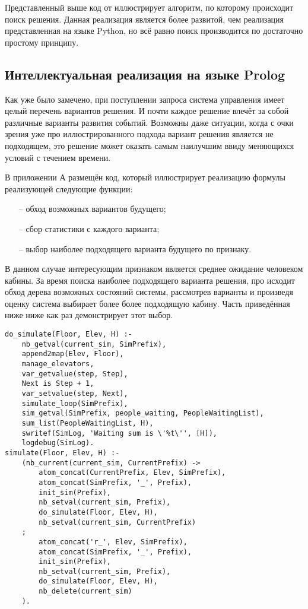 	Представленный выше код от иллюстрирует алгоритм, по которому происходит поиск решения.
		Данная реализация является более развитой, чем реализация представленная на языке Python,
		но всё равно поиск производится по достаточно простому принципу.

	\subsection{Интеллектуальная реализация на языке Prolog}

		Как уже было замечено, при поступлении запроса система управления имеет целый перечень вариантов решения.
			И почти каждое решение влечёт за собой различные варианты развития событий. Возможны даже
			ситуации, когда с очки зрения уже про иллюстрированного подхода вариант решения является не подходящем,
			это решение может оказать самым наилучшим ввиду меняющихся условий с течением времени.

		В приложении А размещён код, который иллюстрирует реализацию формулы реализующей следующие функции:
		\begin{itemize}
			\item[--] обход возможных вариантов будущего;
			\item[--] сбор статистики с каждого варианта;
			\item[--] выбор наиболее подходящего варианта будущего по признаку.
		\end{itemize}

			В данном случае интересующим признаком является среднее ожидание человеком кабины. 
				За время поиска наиболее подходящего варианта решения, про исходит обход дерева
				возможных состояний системы, рассмотрев варианты и произведя оценку система выбирает более
				более подходящую кабину. Часть приведённая ниже ниже как раз демонстрирует  этот выбор.
\begin{lstlisting}
do_simulate(Floor, Elev, H) :-
	nb_getval(current_sim, SimPrefix),
	append2map(Elev, Floor),
	manage_elevators,
	var_getvalue(step, Step),
	Next is Step + 1,
	var_setvalue(step, Next),
	simulate_loop(SimPrefix),
	sim_getval(SimPrefix, people_waiting, PeopleWaitingList),
	sum_list(PeopleWaitingList, H),
	swritef(SimLog, 'Waiting sum is \'%t\'', [H]),
	logdebug(SimLog).
simulate(Floor, Elev, H) :-
	(nb_current(current_sim, CurrentPrefix) ->
		atom_concat(CurrentPrefix, Elev, SimPrefix),
		atom_concat(SimPrefix, '_', Prefix),
		init_sim(Prefix),
		nb_setval(current_sim, Prefix),
		do_simulate(Floor, Elev, H),
		nb_setval(current_sim, CurrentPrefix)
	;
		atom_concat('r_', Elev, SimPrefix),
		atom_concat(SimPrefix, '_', Prefix),
		init_sim(Prefix),
		nb_setval(current_sim, Prefix),
		do_simulate(Floor, Elev, H),
		nb_delete(current_sim)
	).
\end{lstlisting}

